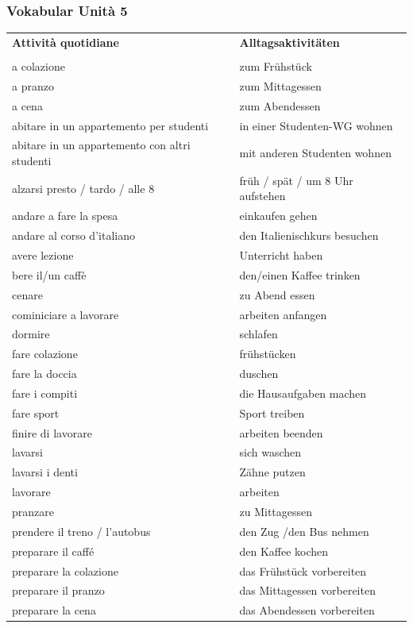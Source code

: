\documentclass[10pt]{scrartcl}
\begin{document}
\begin{multicols*}{2}
\subsubsection*{Vokabular Unità 5}
\begin{supertabular}{p{4cm}p{4cm}}
\textbf{Attività quotidiane} & \textbf{Alltagsaktivitäten}\\
\\
a colazione & zum Frühstück\\
a pranzo & zum Mittagessen\\
a cena & zum Abendessen\\
abitare in un appartemento per studenti & in einer Studenten-WG wohnen\\
abitare in un appartemento con altri studenti & mit anderen Studenten wohnen\\
alzarsi presto / tardo / alle 8 & früh / spät / um 8 Uhr aufstehen\\
andare a fare la spesa & einkaufen gehen\\
andare al corso d'italiano & den Italienischkurs besuchen\\
avere lezione & Unterricht haben\\
bere il/un caffè & den/einen Kaffee trinken\\
cenare & zu Abend essen\\
cominiciare a lavorare & arbeiten anfangen\\
dormire & schlafen\\
fare colazione & frühstücken\\
fare la doccia & duschen\\
fare i compiti & die Hausaufgaben machen\\
fare sport & Sport treiben\\
finire di lavorare & arbeiten beenden\\
lavarsi & sich waschen\\
lavarsi i denti & Zähne putzen\\
lavorare & arbeiten\\
pranzare & zu Mittagessen\\
prendere il treno / l'autobus & den Zug /den Bus nehmen\\
preparare il caffé & den Kaffee kochen\\
preparare la colazione & das Frühstück vorbereiten\\
preparare il pranzo & das Mittagessen vorbereiten\\
preparare la cena & das Abendessen vorbereiten\\

\end{supertabular}
\end{multicols*}
\end{document}
